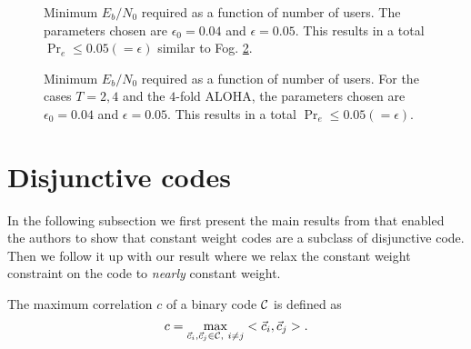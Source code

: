 \begin{figure}[h]
\centering
 \resizebox{0.6\textwidth}{!}{}
  \caption{Minimum $E_b/N_0$ required as a function of number of users. The parameters chosen are $\epsilon_0=0.04$ and $\epsilon=0.05$.  This results in a total $\Pr_e\leq 0.05(=\epsilon)$ similar to Fog. \ref{fig:simulationresults30000}.}
  \label{fig:simulationresults_new}
\end{figure}


\begin{figure}[h]
\centering
 \resizebox{0.6\textwidth}{!}{}
  \caption{Minimum $E_b/N_0$ required as a function of number of users. For the cases $ T=2,4$ and the $4$-fold ALOHA, the parameters chosen are $\epsilon_0=0.04$ and $\epsilon=0.05$.  This results in a total $\Pr_e\leq 0.05(=\epsilon)$.}
  \label{fig:simulationresults30000}
\end{figure}



\section{Disjunctive codes}
In the following subsection we first present the main results from \cite{fan1995superimposed} that enabled the authors to show that constant weight codes are a subclass of disjunctive code. Then we follow it up with our result where we relax the constant weight constraint on the code to \textit{nearly} constant weight.
\begin{definition}
The maximum correlation $c$ of a binary code $\mathcal{C}$ is defined as
\[
c=\max_{\vec{c}_i,\vec{c}_j\in \mathcal{C},~i\neq j} < \vec{c}_i,\vec{c}_j>.
\]
\end{definition}

